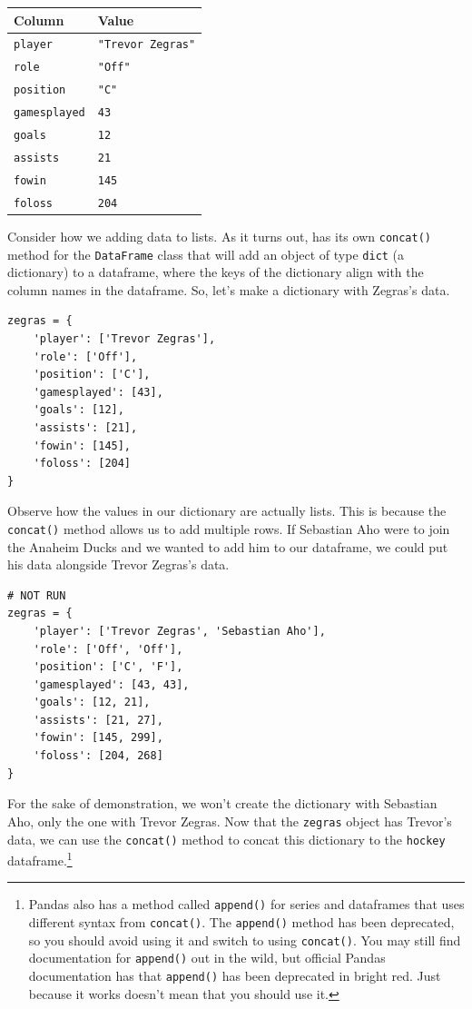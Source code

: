 \begin{tabular}{|l|l|}
\hline
Column             & Value                  \\
\hline
\verb|player|      & \verb|"Trevor Zegras"| \\
\hline
\verb|role|        & \verb|"Off"|           \\
\hline
\verb|position|    & \verb|"C"|             \\
\hline
\verb|gamesplayed| & \verb|43|              \\
\hline
\verb|goals|       & \verb|12|              \\
\hline
\verb|assists|     & \verb|21|              \\
\hline
\verb|fowin|       & \verb|145|             \\
\hline
\verb|foloss|      & \verb|204|            \\
\hline
\end{tabular}\par
\vspace{5mm}
Consider how we adding data to lists. As it turns out,  has its own \verb|concat()| method for the \verb|DataFrame| class that will add an object of type \verb|dict| (a dictionary) to a  dataframe, where the keys of the dictionary align with the column names in the dataframe. So, let's make a dictionary with Zegras's data.
\begin{lstlisting}[style=pippython]
zegras = {
	'player': ['Trevor Zegras'],
	'role': ['Off'],
	'position': ['C'],
	'gamesplayed': [43],
	'goals': [12],
	'assists': [21],
	'fowin': [145],
	'foloss': [204]
}
\end{lstlisting}
Observe how the values in our dictionary are actually lists. This is because the \verb|concat()| method allows us to add multiple rows. If Sebastian Aho were to join the Anaheim Ducks and we wanted to add him to our dataframe, we could put his data alongside Trevor Zegras's data.\par
\begin{lstlisting}[style=pippython]
# NOT RUN
zegras = {
	'player': ['Trevor Zegras', 'Sebastian Aho'],
	'role': ['Off', 'Off'],
	'position': ['C', 'F'],
	'gamesplayed': [43, 43],
	'goals': [12, 21],
	'assists': [21, 27],
	'fowin': [145, 299],
	'foloss': [204, 268]
}
\end{lstlisting}
For the sake of demonstration, we won't create the dictionary with Sebastian Aho, only the one with Trevor Zegras. Now that the \verb|zegras| object has Trevor's data, we can use the \verb|concat()| method to concat this dictionary to the \verb|hockey| dataframe.\cprotect\footnote{Pandas also has a method called \verb|append()| for series and dataframes that uses different syntax from \verb|concat()|. The \verb|append()| method has been deprecated, so you should avoid using it and switch to using \verb|concat()|. You may still find documentation for \verb|append()| out in the wild, but official Pandas documentation has that \verb|append()| has been deprecated in bright red. Just because it works doesn't mean that you should use it.}\par
